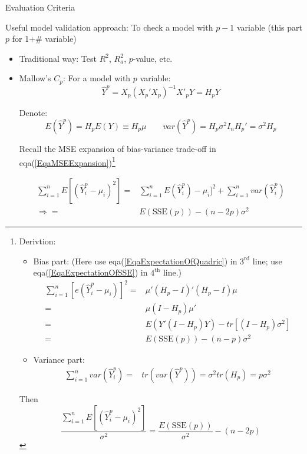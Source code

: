 \begin{point}
    \hypertarget{ModelValidationCriteria}{Evaluation Criteria}
\end{point}

     Useful model validation approach: To check a model with $ p-1 $ variable (this part $ p $ for 1+\# variable)
        \begin{itemize}[topsep=2pt,itemsep=2pt]
        \item Traditional way: Test $ R^2 $, $ R_a^2 $, $ p $-value, etc.
        \item Mallow's $ C_p $: For a model with $ p $ variable: 
        \[
            \hat{Y}^p=X_p(X_p'X_p)^{-1}X'_pY=H_pY 
        \]
        
        Denote:
        \[
            E(\hat{Y}^p)=H_pE(Y)\equiv H_p\mu \qquad var(\hat{Y}^p)=H_p\sigma ^2I_nH_p'=\sigma ^2H_p
        \]

        Recall the MSE expansion of bias-variance trade-off in eqa(\ref{EqaMSEExpansion})\footnote{Derivtion:
        \begin{itemize}[topsep=2pt,itemsep=0pt]
            \item Bias part: (Here use eqa(\ref{EqaExpectationOfQuadric}) in $ 3^\mathrm{rd} $ line; use eqa(\ref{EqaExpectationOfSSE}) in $ 4^\mathrm{th} $ line.)
            \begin{align*}
                \sum_{i=1}^n[e(\hat{Y}_i^p-\mu _i)]^2=&\mu'(H_p-I)'(H_p-I)\mu\\
                =&\mu (I-H_p)\mu '\\
                =&E(Y'(I-H_p)Y)-tr[(I-H_p)\sigma ^2]\\
                =&E(\mathrm{SSE}(p))-(n-p)\sigma ^2
            \end{align*}
            \item Variance part:
            \begin{align*}
                \sum_{i=1}^nvar(\hat{Y}_i^p)=& tr(var(\hat{Y}^p))=\sigma ^2tr(H_p)=p\sigma ^2
            \end{align*}
        \end{itemize}

        Then
        \[
             \dfrac{\sum_{i=1}^n E[(\hat{Y}_i^p-\mu_i)^2]}{\sigma ^2}=\dfrac{E(\mathrm{SSE}(p) )}{\sigma ^2}-(n-2p)
        \]
            }

        \begin{align*}
            \sum_{i=1}^n E[(\hat{Y}_i^p-\mu_i)^2]=&\sum_{i=1}^nE(\hat{Y}^p_i)-\mu_i]^2+\sum_{i=1}^nvar(\hat{Y}_i^p)\\
            \Rightarrow =&E(\mathrm{SSE}(p) )-(n-2p)\sigma ^2
        \end{align*}
            

\end{itemize}
